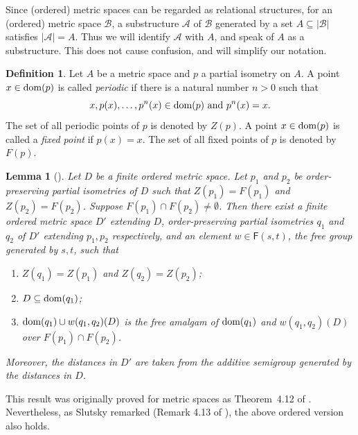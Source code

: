 \documentclass[10pt,a4paper]{amsart}
\newtheorem{lemma}[theorem]{Lemma}
\theoremstyle{definition}
\newtheorem{definition}{Definition}[section]
\theoremstyle{remark}
\begin{document}
Since (ordered) metric spaces can be regarded as relational structures, for an (ordered) metric space $\mathcal{B}$, a substructure $\mathcal{A}$ of $\mathcal{B}$ generated by a set $A\subseteq |\mathcal{B}|$ satisfies $|\mathcal{A}|=A$. Thus we will identify $\mathcal{A}$ with $A$, and speak of $A$ as a substructure. This does not cause confusion, and will simplify our notation.

    \begin{definition}
        Let $A$ be a metric space and $p$ a partial isometry on $A$. A point $x \in {\rm dom}(p)$ is called {\em periodic} if there is a natural number $n>0$ such that \[x,p(x),\dots,p^n(x)\in {\rm dom}(p) \ {\rm and} \ p^n(x)=x.\] The set of all periodic points of $p$ is denoted by $Z(p)$. A point $x \in {\rm dom}(p)$ is called a {\em fixed point} if $p(x)=x$. The set of all fixed points of $p$ is denoted by $F(p)$. 
    \end{definition}

    \begin{lemma}[\cite{Slutsky}]\label{lemma:Extensions}
        Let $D$ be a finite ordered metric space. Let $p_1$ and $p_2$ be order-preserving partial isometries of $D$ such that $Z(p_1)=F(p_1)$ and $Z(p_2)=F(p_2)$. Suppose $F(p_1) \cap F(p_2) \neq \emptyset$. Then there exist a finite ordered metric space $D'$ extending $D$, order-preserving  partial isometries $q_1$ and $q_2$ of $D'$ extending $p_1,p_2$ respectively, and an element $w \in \mathsf{F}(s,t)$, the free group generated by ${s,t}$, such that 
        \begin{enumerate}
           \item $Z(q_1)=Z(p_1)$ and $Z(q_2)=Z(p_2)$;
           \item $D \subseteq {\rm dom}(q_1)$;
           \item ${\rm dom}(q_1) \cup w(q_1,q_2)(D)$ is the free amalgam of ${\rm dom}(q_1)$ and \linebreak $w(q_1,q_2)(D)$ over $F(p_1) \cap F(p_2)$. %
        \end{enumerate}
        Moreover, the distances in $D'$ are taken from the additive semigroup generated by the distances in $D$. 
     \end{lemma}

     This result was originally proved for metric spaces as Theorem~4.12 of \cite{Slutsky}. Nevertheless, as Slutsky remarked (Remark 4.13 of \cite{Slutsky}), the above ordered version also holds. 
\end{document}
